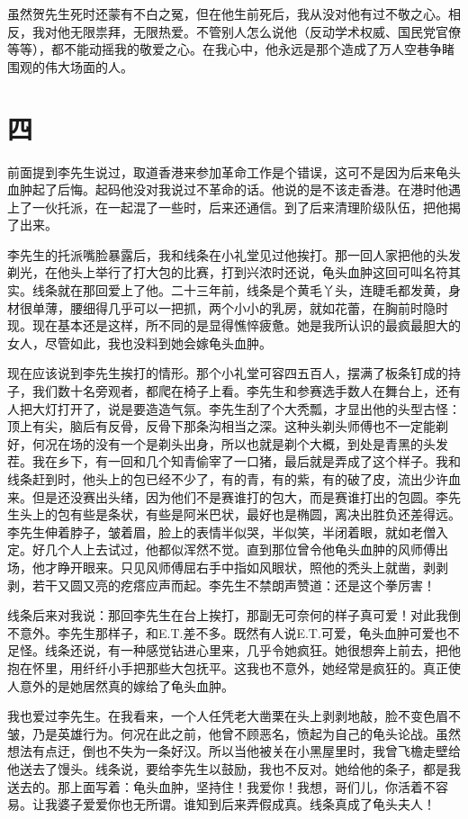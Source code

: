虽然贺先生死时还蒙有不白之冤，但在他生前死后，我从没对他有过不敬之心。相反，我对他无限祟拜，无限热爱。不管别人怎么说他（反动学术权威、国民党官僚等等），都不能动摇我的敬爱之心。在我心中，他永远是那个造成了万人空巷争睹围观的伟大场面的人。

\section{四}

前面提到李先生说过，取道香港来参加革命工作是个错误，这可不是因为后来龟头血肿起了后悔。起码他没对我说过不革命的话。他说的是不该走香港。在港时他遇上了一伙托派，在一起混了一些时，后来还通信。到了后来清理阶级队伍，把他揭了出来。 

李先生的托派嘴脸暴露后，我和线条在小礼堂见过他挨打。那一回人家把他的头发剃光，在他头上举行了打大包的比赛，打到兴浓时还说，龟头血肿这回可叫名符其实。线条就在那回爱上了他。二十三年前，线条是个黄毛丫头，连睫毛都发黄，身材很单薄，腰细得几乎可以一把抓，两个小小的乳房，就如花蕾，在胸前时隐时现。现在基本还是这样，所不同的是显得憔悴疲惫。她是我所认识的最疯最胆大的女人，尽管如此，我也没料到她会嫁龟头血肿。 


现在应该说到李先生挨打的情形。那个小礼堂可容四五百人，摆满了板条钉成的持子，我们数十名旁观者，都爬在椅子上看。李先生和参赛选手数人在舞台上，还有人把大灯打开了，说是要造造气氛。李先生刮了个大秃瓢，才显出他的头型古怪：顶上有尖，脑后有反骨，反骨下那条沟相当之深。这种头剃头师傅也不一定能剃好，何况在场的没有一个是剃头出身，所以也就是剃个大概，到处是青黑的头发茬。我在乡下，有一回和几个知青偷宰了一口猪，最后就是弄成了这个样子。我和线条赶到时，他头上的包已经不少了，有的青，有的紫，有的破了皮，流出少许血来。但是还没赛出头绪，因为他们不是赛谁打的包大，而是赛谁打出的包圆。李先生头上的包有些是条状，有些是阿米巴状，最好也是椭圆，离决出胜负还差得远。李先生伸着脖子，皱着眉，脸上的表情半似哭，半似笑，半闭着眼，就如老僧入定。好几个人上去试过，他都似浑然不觉。直到那位曾令他龟头血肿的风师傅出场，他才睁开眼来。只见风师傅屈右手中指如风眼状，照他的秃头上就凿，剥剥剥，若干又圆又亮的疙瘩应声而起。李先生不禁朗声赞道：还是这个拳厉害！ 

线条后来对我说：那回李先生在台上挨打，那副无可奈何的样子真可爱！对此我倒不意外。李先生那样子，和E.T.差不多。既然有人说E.T.可爱，龟头血肿可爱也不足怪。线条还说，有一种感觉钻进心里来，几乎令她疯狂。她很想奔上前去，把他抱在怀里，用纤纤小手把那些大包抚平。这我也不意外，她经常是疯狂的。真正使人意外的是她居然真的嫁给了龟头血肿。 

我也爱过李先生。在我看来，一个人任凭老大凿栗在头上剥剥地敲，脸不变色眉不皱，乃是英雄行为。何况在此之前，他曾不顾恶名，愤起为自己的龟头论战。虽然想法有点迂，倒也不失为一条好汉。所以当他被关在小黑屋里时，我曾飞檐走壁给他送去了馒头。线条说，要给李先生以鼓励，我也不反对。她给他的条子，都是我送去的。那上面写着：龟头血肿，坚持住！我爱你！我想，哥们儿，你活着不容易。让我婆子爱爱你也无所谓。谁知到后来弄假成真。线条真成了龟头夫人！

